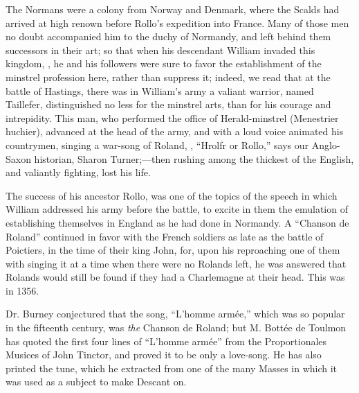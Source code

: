 The Normans were a colony from Norway and Denmark, where the Scalds
had arrived at high renown before Rollo’s expedition into France. Many
of those men no doubt accompanied him to the duchy of Normandy, and left
behind them successors in their art; so that when his descendant William
invaded this kingdom, , he and his followers were sure to favor the
establishment of the minstrel profession here, rather than suppress it; indeed,
we read that at the battle of Hastings, there was in William’s army a valiant
warrior, named Taillefer, distinguished no less for the minstrel arts, than for his
courage and intrepidity. This man, who performed the office of Herald-minstrel
(Menestrier huchier), advanced at the head of the army, and with a loud voice
animated his countrymen, singing a war-song of Roland, \ie, “Hrolfr or Rollo,”
says our Anglo-Saxon historian, Sharon Turner;—then rushing among the
thickest of the English, and valiantly fighting, lost his life.

The success of his ancestor Rollo, was one of the topics of the speech in which
William addressed his army before the battle, to excite in them the emulation of
establishing themselves in England as he had done in Normandy. A “Chanson
de Roland” continued in favor with the French soldiers as late as the battle of
Poictiers, in the time of their king John, for, upon his reproaching one of them with
singing it at a time when there were no Rolands left, he was answered that
Rolands would still be found if they had a Charlemagne at their head. This was
in 1356.

Dr. Burney conjectured that the song, “L’homme armée,” which was so popular
in the fifteenth century, was \textit{the} Chanson de Roland; but M. Bottée de Toulmon
has quoted the first four lines of “L’homme armée” from the Proportionales
Musices of John Tinctor, and proved it to be only a love-song. He has also
printed the tune, which he extracted from one of the many Masses in which it
was used as a subject to make Descant on.
\pagebreak

